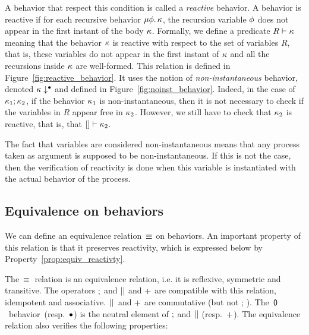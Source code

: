 \documentclass[9pt,preprint]{sigplanconf}
\begin{document}
A behavior that respect this condition is called a \emph{reactive} behavior. A behavior is reactive if for each recursive behavior $\mu \phi.\, \kappa$, the recursion variable $\phi$ does not appear in the first instant of the body $\kappa$. Formally, we define a predicate $R \vdash \kappa$ meaning that the behavior $\kappa$ is reactive with respect to the set of variables $R$, that is, these variables do not appear in the first instant of $\kappa$ and all the recursions inside $\kappa$ are well-formed. This relation is defined in Figure~\ref{fig:reactive_behavior}. It uses the notion of \emph{non-instantaneous} behavior, denoted $\kappa\downarrow^{\bullet}$ and defined in Figure~\ref{fig:noinst_behavior}. Indeed, in the case of $\kappa_1 ; \kappa_2$, if the behavior $\kappa_1$ is non-instantaneous, then it is not necessary to check if the variables in $R$ appear free in $\kappa_2$. However, we still have to check that $\kappa_2$ is reactive, that is, that $[] \vdash \kappa_2$.

The fact that variables are considered non-instantaneous means that any process taken as argument is supposed to be non-instantaneous. If this is not the case, then the verification of reactivity is done when this variable is instantiated with the actual behavior of the process.

\subsection{Equivalence on behaviors}
\label{sec:equiv_behaviors}

We can define an equivalence relation~$\equiv$ on behaviors. An important property of this relation is that it preserves reactivity, which is expressed below by Property~\ref{prop:equiv_reactivty}.

The~$\equiv$~relation is an equivalence relation, i.e. it is reflexive, symmetric and transitive. The operators $;$ and $ \mid\mid $ and $+$ are compatible with this relation, idempotent and associative. $ \mid\mid $~and $+$ are commutative (but not $;\,$). The~$\textsf{0}$~behavior~(resp.~$\bullet$) is the neutral element of $;$ and $ \mid\mid $ (resp.~$+$). The equivalence relation also verifies the following properties:
%
\end{document}
